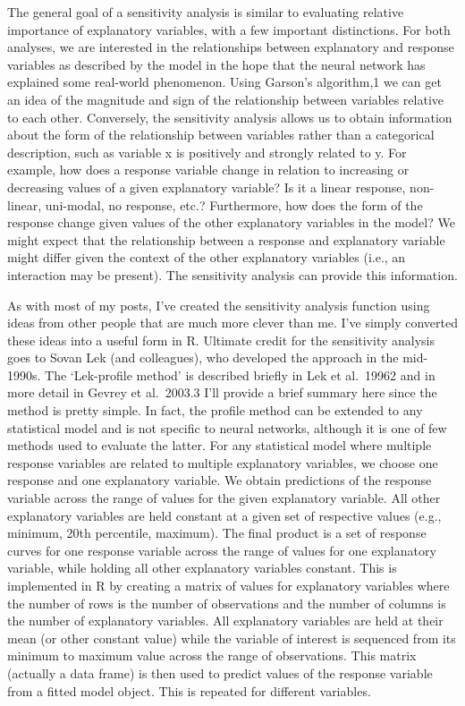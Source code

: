 \documentclass[]{book}
\begin{document}
The general goal of a sensitivity analysis is similar to evaluating relative importance of explanatory variables, with a few important distinctions. For both analyses, we are interested in the relationships between explanatory and response variables as described by the model in the hope that the neural network has explained some real-world phenomenon. Using Garson's algorithm,1 we can get an idea of the magnitude and sign of the relationship between variables relative to each other. Conversely, the sensitivity analysis allows us to obtain information about the form of the relationship between variables rather than a categorical description, such as variable x is positively and strongly related to y. For example, how does a response variable change in relation to increasing or decreasing values of a given explanatory variable? Is it a linear response, non-linear, uni-modal, no response, etc.? Furthermore, how does the form of the response change given values of the other explanatory variables in the model? We might expect that the relationship between a response and explanatory variable might differ given the context of the other explanatory variables (i.e., an interaction may be present). The sensitivity analysis can provide this information.

As with most of my posts, I've created the sensitivity analysis function using ideas from other people that are much more clever than me. I've simply converted these ideas into a useful form in R. Ultimate credit for the sensitivity analysis goes to Sovan Lek (and colleagues), who developed the approach in the mid-1990s. The `Lek-profile method' is described briefly in Lek et al.~19962 and in more detail in Gevrey et al.~2003.3 I'll provide a brief summary here since the method is pretty simple. In fact, the profile method can be extended to any statistical model and is not specific to neural networks, although it is one of few methods used to evaluate the latter. For any statistical model where multiple response variables are related to multiple explanatory variables, we choose one response and one explanatory variable. We obtain predictions of the response variable across the range of values for the given explanatory variable. All other explanatory variables are held constant at a given set of respective values (e.g., minimum, 20th percentile, maximum). The final product is a set of response curves for one response variable across the range of values for one explanatory variable, while holding all other explanatory variables constant. This is implemented in R by creating a matrix of values for explanatory variables where the number of rows is the number of observations and the number of columns is the number of explanatory variables. All explanatory variables are held at their mean (or other constant value) while the variable of interest is sequenced from its minimum to maximum value across the range of observations. This matrix (actually a data frame) is then used to predict values of the response variable from a fitted model object. This is repeated for different variables.
\end{document}
